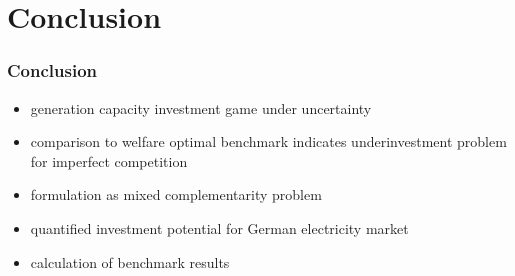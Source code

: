 \section{Conclusion}
\begin{frame}
  \frametitle{Conclusion}
  \begin{itemize}
  \item generation capacity investment game under uncertainty
  \item comparison to welfare optimal benchmark indicates underinvestment problem for imperfect competition
  \item formulation as mixed complementarity problem
  \end{itemize}
  
  \vspace{0.5cm}

  \begin{itemize}
  \item quantified investment potential for German electricity market
   \item calculation of benchmark results
  \end{itemize}
\end{frame}